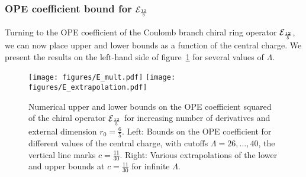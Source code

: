 \subsubsection*{OPE coefficient bound for \texorpdfstring{${\mathcal{E}}_{\frac{12}5}$}{E2r0 OPE coefficient bound}}

Turning to the OPE coefficient of the Coulomb branch chiral ring operator ${\mathcal{E}}_{\frac{12}5}$, we can now place upper and lower bounds  as a function of the central charge. We present the results on the left-hand side of figure~\ref{Fig:Ebound} for several values of $\Lambda$.

\begin{figure}[htb!]
             \begin{center}           
              \texttt{[image: figures/E\_mult.pdf]}
              \texttt{[image: figures/E\_extrapolation.pdf]}
              \caption{Numerical upper and lower bounds on the OPE coefficient squared of the chiral operator ${\mathcal{E}}_{\frac{12}5}$ for increasing number of derivatives and external dimension $r_0=\frac65$. Left: Bounds on the OPE coefficient for different values of the central charge, with cutoffs $\Lambda=26,\ldots,40$, the vertical line marks $c=\tfrac{11}{30}$. Right: Various extrapolations of the lower and upper bounds at $c=\tfrac{11}{30}$ for infinite $\Lambda$.}
              \label{Fig:Ebound}
            \end{center}
\end{figure}

